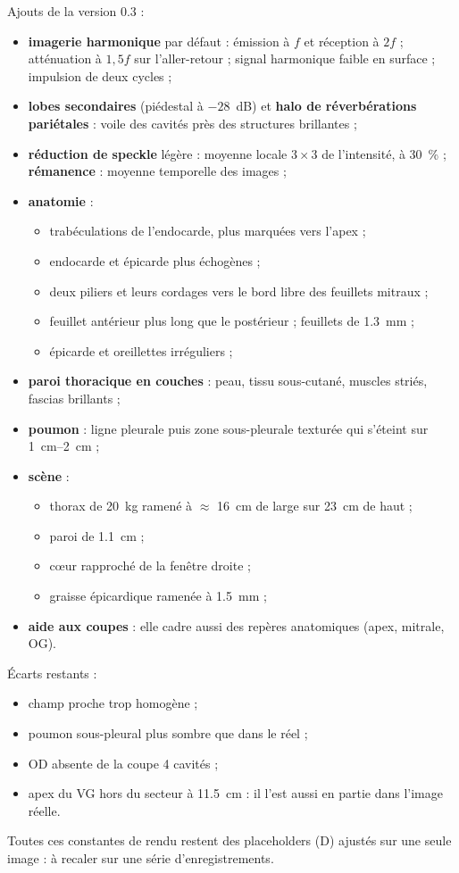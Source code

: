\documentclass[10pt,a4paper]{article}
\begin{document}
Ajouts de la version 0.3 :
\begin{itemize}
\item \textbf{imagerie harmonique} par défaut : émission à $f$ et réception à $2f$ ; atténuation à $1{,}5f$ sur
l'aller-retour ; signal harmonique faible en surface ; impulsion de deux cycles ;
\item \textbf{lobes secondaires} (piédestal à $-28$~dB) et \textbf{halo de réverbérations pariétales} : voile des
cavités près des structures brillantes ;
\item \textbf{réduction de speckle} légère : moyenne locale $3\times3$ de l'intensité, à 30~\% ;
\textbf{rémanence} : moyenne temporelle des images ;
\item \textbf{anatomie} :
  \begin{itemize}
  \item trabéculations de l'endocarde, plus marquées vers l'apex ;
  \item endocarde et épicarde plus échogènes ;
  \item deux piliers et leurs cordages vers le bord libre des feuillets mitraux ;
  \item feuillet antérieur plus long que le postérieur ; feuillets de \SI{1,3}{mm} ;
  \item épicarde et oreillettes irréguliers ;
  \end{itemize}
\item \textbf{paroi thoracique en couches} : peau, tissu sous-cutané, muscles striés, fascias brillants ;
\item \textbf{poumon} : ligne pleurale puis zone sous-pleurale texturée qui s'éteint sur \SIrange{1}{2}{cm} ;
\item \textbf{scène} :
  \begin{itemize}
  \item thorax de 20~kg ramené à $\approx$ \SI{16}{cm} de large sur \SI{23}{cm} de haut ;
  \item paroi de \SI{1,1}{cm} ;
  \item cœur rapproché de la fenêtre droite ;
  \item graisse épicardique ramenée à \SI{1,5}{mm} ;
  \end{itemize}
\item \textbf{aide aux coupes} : elle cadre aussi des repères anatomiques (apex, mitrale, OG).
\end{itemize}

Écarts restants :
\begin{itemize}
\item champ proche trop homogène ;
\item poumon sous-pleural plus sombre que dans le réel ;
\item OD absente de la coupe 4 cavités ;
\item apex du VG hors du secteur à \SI{11,5}{cm} : il l'est aussi en partie dans l'image réelle.
\end{itemize}
Toutes ces constantes de rendu restent des placeholders (D) ajustés sur une seule image : à recaler sur une série
d'enregistrements.
\end{document}
